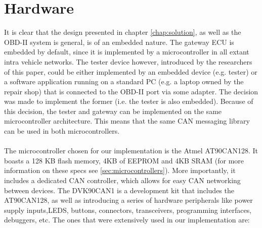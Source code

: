 \section{Hardware}
\label{sec:hardware}
It is clear that the design presented in chapter \ref{chap:solution}, as well as the OBD-II system is general, is of an embedded nature. The gateway ECU is embedded by default, since it is implemented by a microcontroller in all extant intra vehicle networks. The tester device however, introduced by the researchers of this paper, could be either implemented by an embedded device (e.g. tester) or a software application running on a standard PC (e.g. a laptop owned by the repair shop) that is connected to the OBD-II port via some adapter. The decision was made to implement the former (i.e. the tester is also embedded). Because of this decision, the tester and gateway can be implemented on the same microcontroller architecture. This means that the same CAN messaging library can be used in both microcontrollers. \\ \\ The microcontroller chosen for our implementation is the Atmel AT90CAN128. It boasts a 128 KB flash memory, 4KB of EEPROM and 4KB SRAM (for more information on these specs see \ref{sec:microcontrollers}). More importantly, it includes a dedicated CAN controller, which allows for easy CAN networking between devices. The DVK90CAN1 is a development kit that includes the AT90CAN128, as well as introducing a series of hardware peripherals like power supply inputs,LEDS, buttons, connectors, transceivers, programming interfaces, debuggers, etc. The ones that were extensively used in our implementation are:
